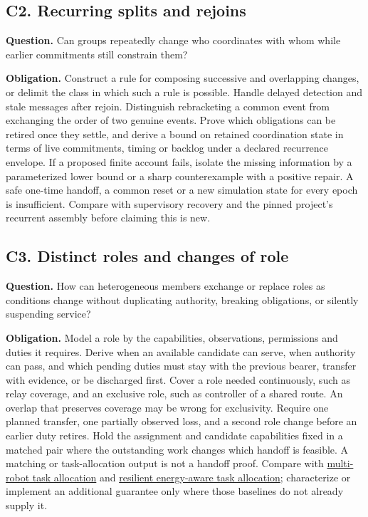 \documentclass[11pt]{article}
\begin{document}
\subsection{C2. Recurring splits and rejoins}
\textbf{Question.} Can groups repeatedly change who coordinates with whom while earlier commitments still constrain them?

\textbf{Obligation.} Construct a rule for composing successive and overlapping changes, or delimit the class in which such a rule is possible. Handle delayed detection and stale messages after rejoin. Distinguish rebracketing a common event from exchanging the order of two genuine events. Prove which obligations can be retired once they settle, and derive a bound on retained coordination state in terms of live commitments, timing or backlog under a declared recurrence envelope. If a proposed finite account fails, isolate the missing information by a parameterized lower bound or a sharp counterexample with a positive repair. A safe one-time handoff, a common reset or a new simulation state for every epoch is insufficient. Compare with supervisory recovery and the pinned project's recurrent assembly before claiming this is new.

\subsection{C3. Distinct roles and changes of role}
\textbf{Question.} How can heterogeneous members exchange or replace roles as conditions change without duplicating authority, breaking obligations, or silently suspending service?

\textbf{Obligation.} Model a role by the capabilities, observations, permissions and duties it requires. Derive when an available candidate can serve, when authority can pass, and which pending duties must stay with the previous bearer, transfer with evidence, or be discharged first. Cover a role needed continuously, such as relay coverage, and an exclusive role, such as controller of a shared route. An overlap that preserves coverage may be wrong for exclusivity. Require one planned transfer, one partially observed loss, and a second role change before an earlier duty retires. Hold the assignment and candidate capabilities fixed in a matched pair where the outstanding work changes which handoff is feasible. A matching or task-allocation output is not a handoff proof. Compare with \href{https://robotics.usc.edu/publications/347/}{multi-robot task allocation} and \href{https://arxiv.org/abs/2105.05586}{resilient energy-aware task allocation}; characterize or implement an additional guarantee only where those baselines do not already supply it.
\end{document}
